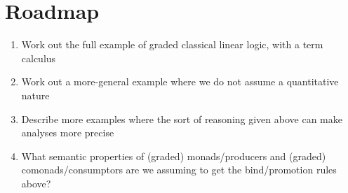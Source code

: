 \documentclass{article}
\begin{document}
\section {Roadmap}

\begin{enumerate}
\item Work out the full example of graded classical linear logic, with a term calculus
\item Work out a more-general example where we do not assume a quantitative nature
\item Describe more examples where the sort of reasoning given above can make analyses more precise
\item What semantic properties of (graded) monads/producers and (graded) comonads/consumptors are we assuming to get the bind/promotion rules above?
\end{enumerate}



\end{document}
